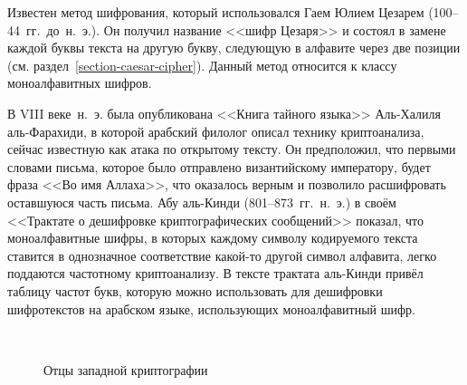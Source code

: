 Известен метод шифрования, который использовался Гаем Юлием Цезарем (100--44~гг.~до~н.~э.). Он получил название <<шифр Цезаря>> и состоял в замене каждой буквы текста на другую букву, следующую в алфавите через две позиции (см. раздел~\ref{section-caesar-cipher}). Данный метод относится к классу моноалфавитных шифров.

В VIII веке~н.~э. была опубликована <<Книга тайного языка>> Аль-Халиля аль-Фарахиди, в которой арабский филолог описал технику криптоанализа, сейчас известную как атака по открытому тексту. Он предположил, что первыми словами письма, которое было отправлено византийскому императору, будет фраза <<Во имя Аллаха>>, что оказалось верным и позволило расшифровать оставшуюся часть письма. Абу аль-Кинди (801--873~гг.~н.~э.) в своём <<Трактате о дешифровке криптографических сообщений>> показал, что моноалфавитные шифры, в которых каждому символу кодируемого текста ставится в однозначное соответствие какой-то другой символ алфавита, легко поддаются частотному криптоанализу. В тексте трактата аль-Кинди привёл таблицу частот букв, которую можно использовать для дешифровки шифротекстов на арабском языке, использующих моноалфавитный шифр.

\begin{figure}[t]
	\centering
	~~~~
	\caption{Отцы западной криптографии}
\end{figure}

